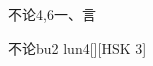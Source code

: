 \begin{entry}{不论}{4,6}{⼀、⾔}
  \begin{phonetics}{不论}{bu2 lun4}[][HSK 3]
  \end{phonetics}
\end{entry}
